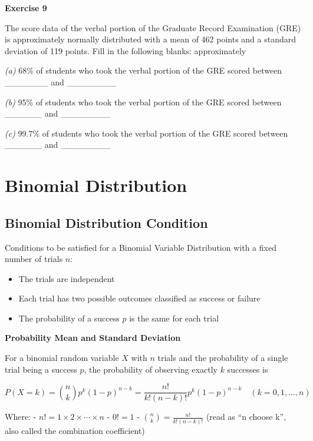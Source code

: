 \documentclass[
]{book}
\providecommand{\tightlist}{%
  \setlength{\itemsep}{0pt}\setlength{\parskip}{0pt}}
\begin{document}
\textbf{Exercise 9}

The score data of the verbal portion of the Graduate Record Examination (GRE) is approximately normally distributed with a mean of 462 points and a standard deviation of 119 points. Fill in the following blanks: approximately

\emph{(a)} 68\% of students who took the verbal portion of the GRE scored between \_\_\_\_\_\_\_ and \_\_\_\_\_\_\_\_

\emph{(b)} 95\% of students who took the verbal portion of the GRE scored between \_\_\_\_\_\_ and \_\_\_\_\_\_\_\_

\emph{(c)} 99.7\% of students who took the verbal portion of the GRE scored between \_\_\_\_\_\_ and \_\_\_\_\_\_\_\_

\chapter{Binomial Distribution}\label{binomial-distribution}

\section{Binomial Distribution Condition}\label{binomial-distribution-condition}

Conditions to be satisfied for a Binomial Variable Distribution with a fixed number of trials \(n\):

\begin{itemize}
\tightlist
\item
  The trials are independent
\item
  Each trial has two possible outcomes classified as success or failure
\item
  The probability of a success \(p\) is the same for each trial
\end{itemize}

\textbf{Probability Mean and Standard Deviation}

For a binomial random variable \(X\) with \(n\) trials and the probability of a single trial being a success \(p\), the probability of observing exactly \(k\) successes is

\[
P(X = k) = \binom{n}{k} p^k (1-p)^{n-k} = \frac{n!}{k!(n-k)!} p^k (1-p)^{n-k} \quad (k = 0, 1, \ldots, n)
\]

Where: - \(n! = 1 \times 2 \times \cdots \times n\) - \(0! = 1\) - \(\binom{n}{k} = \frac{n!}{k!(n-k)!}\) (read as ``n choose k'', also called the combination coefficient)
\end{document}
